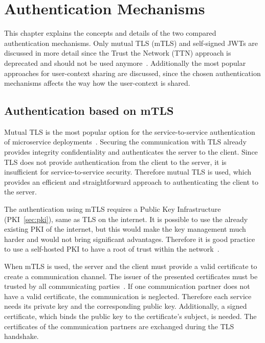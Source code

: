\chapter{Authentication Mechanisms}
\label{cha:authentication_mechanisms}
This chapter explains the concepts and details of the two compared authentication mechanisms.
Only mutual TLS (mTLS) and self-signed JWTs are discussed in more detail since the Trust the Network (TTN) approach is deprecated and should not be used anymore~\cite{dias2020microservices}.
Additionally the most popular approaches for user-context sharing are discussed, since the chosen authentication mechanisms affects the way how the user-context is shared.


\section{Authentication based on mTLS}
Mutual TLS is the most popular option for the service-to-service authentication of microservice deployments~\cite{dias2020microservices}.
Securing the communication with TLS already provides integrity confidentiality and authenticates the server to the client.
Since TLS does not provide authentication from the client to the server, it is insufficient for service-to-service security.
Therefore mutual TLS is used, which provides an efficient and straightforward approach to authenticating the client to the server.

The authentication using mTLS requires a Public Key Infrastructure (PKI~\ref{sec:pki}), same as TLS on the internet.
It is possible to use the already existing PKI of the internet, but this would make the key management much harder and would not bring significant advantages.
Therefore it is good practice to use a self-hosted PKI to have a root of trust within the network~\cite{dias2020microservices}.

When mTLS is used, the server and the client must provide a valid certificate to create a communication channel.
The issuer of the presented certificates must be trusted by all communicating parties~\cite{dias2020microservices}.
If one communication partner does not have a valid certificate, the communication is neglected.
Therefore each service needs its private key and the corresponding public key.
Additionally, a signed certificate, which binds the public key to the certificate's subject, is needed.
The certificates of the communication partners are exchanged during the TLS handshake.

